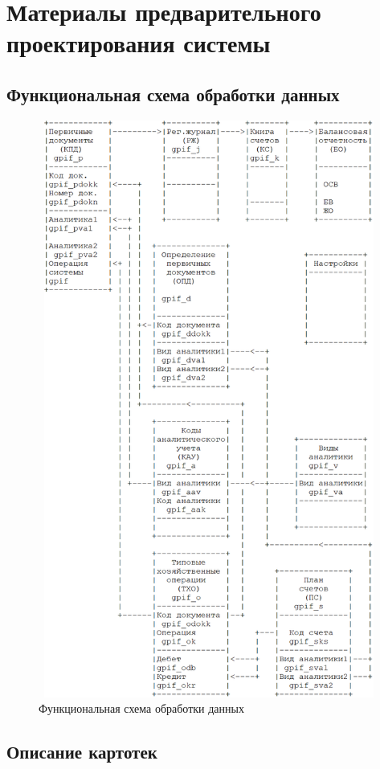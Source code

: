 \section{Материалы предварительного проектирования системы}
\subsection{Функциональная схема обработки данных}

\begin{figure}[!htb]
    \centering
    \includegraphics[height=19cm, width=14cm]
        {_assets/gpif_part2.png}
    \caption{Функциональная схема обработки данных}
\end{figure}

\subsection{Описание картотек}

